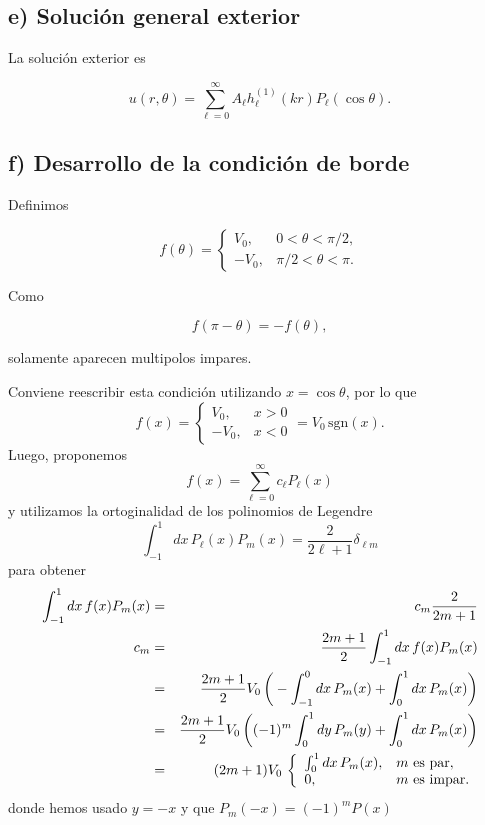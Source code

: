 \documentclass[11pt,spanish]{article}
\begin{document}
\subsection*{e) Solución general exterior}

La solución exterior es

\[
u(r,\theta)
=
\sum_{\ell=0}^{\infty}
A_\ell
h_\ell^{(1)}(kr)
P_\ell(\cos\theta).
\]


\subsection*{f) Desarrollo de la condición de borde}

Definimos

\[
f(\theta)
=
\begin{cases}
V_0,&0<\theta<\pi/2,\\
-V_0,&\pi/2<\theta<\pi.
\end{cases}
\]

Como

\[
f(\pi-\theta)
=
-f(\theta),
\]

solamente aparecen multipolos impares.

%
%
%
%
%
%
%

Conviene reescribir esta condición utilizando $x=\cos \theta$, por lo que
$$
f(x)
=
\left\{
\begin{array}{ll}
V_0, & x > 0 \\
-V_0, & x < 0
\end{array}
\right.
=
V_0\, \mathrm{sgn}(x).
$$
Luego, proponemos
$$
f(x)
=
\sum_{\ell = 0}^{\infty}
c_{\ell}
P_{\ell}(x)
$$
y utilizamos la ortoginalidad de los polinomios de Legendre
$$
\int_{-1}^1
dx\,
P_{\ell}(x)
P_{m}(x)
=
\frac{2}{2\ell+1}
\delta_{\ell m}
$$
para obtener
\begin{eqnarray}
\int_{-1}^1
dx\,
f(x)
P_m(x)
&=&
c_m
\frac{2}{2m+1}
\notag
\\
c_m
&=&
\frac{2m+1}{2}
\int_{-1}^1
dx\,
f(x)
P_m(x)
\notag
\\
&=&
\frac{2m+1}{2}
V_0\,
\bigg(
-
\int_{-1}^0
dx\,
P_m(x)
+
\int_0^1
dx\,
P_m(x)
\bigg)
\notag
\\
&=&
\frac{2m+1}{2}
V_0\,
\bigg(
(-1)^m
\int_0^1
dy\,
P_m(y)
+
\int_0^1
dx\,
P_m(x)
\bigg)
\notag
\\
&=&
(2m+1)
V_0\,
\left\{
\begin{array}{ll}
\int_0^1
dx\,
P_m(x), & \text{$m$ es par},\\
0, & \text{$m$ es impar.}
\end{array}
\right.
\notag
\end{eqnarray}
donde hemos usado $y=-x$ y que $P_m(-x)=(-1)^mP(x)$
\end{document}
